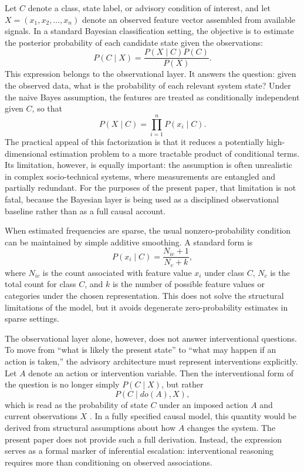 \documentclass[11pt]{article}
\begin{document}
Let $C$ denote a class, state label, or advisory condition of interest, and let $X = (x_1, x_2, \ldots, x_n)$ denote an observed feature vector assembled from available signals. In a standard Bayesian classification setting, the objective is to estimate the posterior probability of each candidate state given the observations:
\begin{equation}
P(C \mid X) = \frac{P(X \mid C)P(C)}{P(X)}.
\end{equation}
This expression belongs to the observational layer. It answers the question: given the observed data, what is the probability of each relevant system state? Under the naive Bayes assumption, the features are treated as conditionally independent given $C$, so that
\begin{equation}
P(X \mid C) = \prod_{i=1}^{n} P(x_i \mid C).
\end{equation}
The practical appeal of this factorization is that it reduces a potentially high-dimensional estimation problem to a more tractable product of conditional terms. Its limitation, however, is equally important: the assumption is often unrealistic in complex socio-technical systems, where measurements are entangled and partially redundant. For the purposes of the present paper, that limitation is not fatal, because the Bayesian layer is being used as a disciplined observational baseline rather than as a full causal account.

When estimated frequencies are sparse, the usual nonzero-probability condition can be maintained by simple additive smoothing. A standard form is
\begin{equation}
P(x_i \mid C) = \frac{N_{ic}+1}{N_c + k},
\end{equation}
where $N_{ic}$ is the count associated with feature value $x_i$ under class $C$, $N_c$ is the total count for class $C$, and $k$ is the number of possible feature values or categories under the chosen representation. This does not solve the structural limitations of the model, but it avoids degenerate zero-probability estimates in sparse settings.

The observational layer alone, however, does not answer interventional questions. To move from ``what is likely the present state'' to ``what may happen if an action is taken,'' the advisory architecture must represent interventions explicitly. Let $A$ denote an action or intervention variable. Then the interventional form of the question is no longer simply $P(C \mid X)$, but rather
\begin{equation}
P(C \mid do(A), X),
\end{equation}
which is read as the probability of state $C$ under an imposed action $A$ and current observations $X$ \citep{pearl2000}. In a fully specified causal model, this quantity would be derived from structural assumptions about how $A$ changes the system. The present paper does not provide such a full derivation. Instead, the expression serves as a formal marker of inferential escalation: interventional reasoning requires more than conditioning on observed associations.
\end{document}
